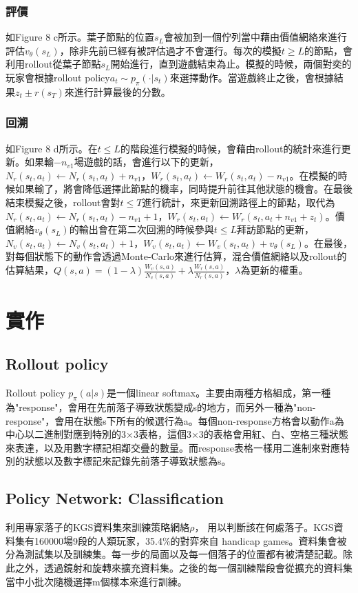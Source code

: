 \documentclass[a4paper,12pt]{article}
\begin{document}
\subsubsection{評價}
\qquad 如Figure 8 c所示。葉子節點的位置$s_{L}$會被加到一個佇列當中藉由價值網絡來進行評估$v_{\theta}(s_{L})$，除非先前已經有被評估過才不會運行。每次的模擬$t\geq L$的節點，會利用rollout從葉子節點$s_{L}$開始進行，直到遊戲結束為止。模擬的時候，兩個對奕的玩家會根據rollout policy$a_{t}\sim p_{\pi}(\cdot |s_{t})$來選擇動作。當遊戲終止之後，會根據結果$z_{t}\pm r(s_{T})$來進行計算最後的分數。

\subsubsection{回溯}
\qquad  如Figure 8 d所示。在$t\leq L$的階段進行模擬的時候，會藉由rollout的統計來進行更新。如果輸$-n_{v1}$場遊戲的話，會進行以下的更新，$N_{r}(s_{t},a_{t})\leftarrow N_{r}(s_{t},a_{t})+n_{v1}$，$W_{r}(s_{t},a_{t})\leftarrow W_{r}(s_{t},a_{t})-n_{v1}$。在模擬的時候如果輸了，將會降低選擇此節點的機率，同時提升前往其他狀態的機會。在最後結束模擬之後，rollout會對$t\leq T$進行統計，來更新回溯路徑上的節點，取代為$N_{r}(s_{t},a_{t})\leftarrow N_{r}(s_{t},a_{t})-n_{v1}+ 1$，$W_{r}(s_{t},a_{t})\leftarrow W_{r}(s_{t},a_{t}+ n_{v1}+ z_{t})$。價值網絡$v_{\theta}(s_{L})$的輸出會在第二次回溯的時候參與$t\leq L$拜訪節點的更新，$N_{v}(s_{t},a_{t})\leftarrow N_{v}(s_{t},a_{t})+1$，$W_{v}(s_{t},a_{t})\leftarrow W_{v}(s_{t},a_{t})+v_{\theta}(s_{L})$。在最後，對每個狀態下的動作會透過Monte-Carlo來進行估算，混合價值網絡以及rollout的估算結果，$Q(s,a)=(1-\lambda)\frac{W_{v}(s,a)}{N_{v}(s,a)}+\lambda\frac{W_{r}(s,a)}{N_{r}(s,a)}$，$\lambda$為更新的權重。
\section{實作}
\subsection{Rollout policy}
\qquad Rollout policy $p_{\pi}(a|s)$是一個linear softmax。主要由兩種方格組成，第一種為"response"，會用在先前落子導致狀態變成s的地方，而另外一種為"non-response"，會用在狀態s下所有的候選行為a。每個non-response方格會以動作a為中心以二進制對應到特別的3×3表格，這個3×3的表格會用紅、白、空格三種狀態來表達，以及用數字標記相鄰交疊的數量。而response表格一樣用二進制來對應特別的狀態以及數字標記來記錄先前落子導致狀態為s。

\subsection{Policy Network: Classification}
\qquad 利用專家落子的KGS資料集來訓練策略網絡$\rho$， 用以判斷該在何處落子。KGS資料集有160000場9段的人類玩家，35.4$\%$的對弈來自 handicap games。資料集會被分為測試集以及訓練集。每一步的局面以及每一個落子的位置都有被清楚記載。除此之外，透過鏡射和旋轉來擴充資料集。之後的每一個訓練階段會從擴充的資料集當中小批次隨機選擇m個樣本來進行訓練。
\end{document}
